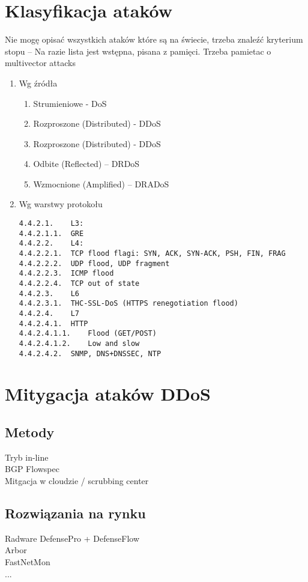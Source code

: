 \section{Klasyfikacja ataków}
Nie mogę opisać wszystkich ataków które są na świecie, trzeba znaleźć kryterium stopu – 
Na razie lista jest wstępna, pisana z pamięci. Trzeba pamietac o multivector attacks 
\begin{enumerate}
\item Wg źródła
	\begin{enumerate}
		\item Strumieniowe - DoS
		\item Rozproszone (Distributed) - DDoS
		\item Rozproszone (Distributed) - DDoS
		\item Odbite (Reflected) – DRDoS
		\item Wzmocnione (Amplified) – DRADoS
	\end{enumerate}
\item Wg warstwy protokołu
\begin{verbatim}
4.4.2.1.	L3:
4.4.2.1.1.	GRE
4.4.2.2.	L4:
4.4.2.2.1.	TCP flood flagi: SYN, ACK, SYN-ACK, PSH, FIN, FRAG
4.4.2.2.2.	UDP flood, UDP fragment
4.4.2.2.3.	ICMP flood
4.4.2.2.4.	TCP out of state
4.4.2.3.	L6
4.4.2.3.1.	THC-SSL-DoS (HTTPS renegotiation flood)
4.4.2.4.	L7
4.4.2.4.1.	HTTP
4.4.2.4.1.1.	Flood (GET/POST)
4.4.2.4.1.2.	Low and slow
4.4.2.4.2.	SNMP, DNS+DNSSEC, NTP
\end{verbatim}
\end{enumerate}

\section{Mitygacja ataków DDoS }
\subsection{Metody}

Tryb in-line\\
BGP Flowspec\\
Mitgacja w cloudzie / scrubbing center
\subsection{Rozwiązania na rynku}

Radware DefensePro + DefenseFlow\\
Arbor\\
FastNetMon \\
...

